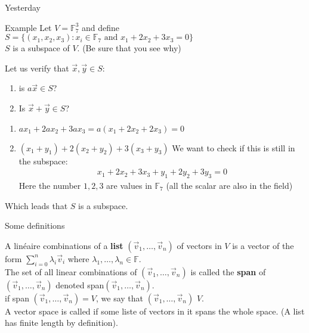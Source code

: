 


\begin{parag}{Yesterday}
    
    \begin{subparag}{Example}
        Let $V =  \mathbb{F}_7^3$ and define $S =  \{\left(x_1, x_2, x_3\right): x_i \in \mathbb{F}_7 \text{ and } x_1 + 2x_2 + 3x_3 = 0\}$\\
        $S$ is a subspace of $V$. (Be sure that you see why)
    \end{subparag}
    Let us verify that $\vec{x}, \vec{y} \in S$:\\
    \begin{enumerate}
        \item is $a\vec{x} \in S$?
        \item Is $\vec{x} + \vec{y} \in S$?
    \end{enumerate}
    \begin{enumerate}
        \item $ax_1 + 2ax_2 + 3ax_3 = a\left(x_1 + 2x_2 + 2x_3\right) =  0$
        \item $\left(x_1 + y_1\right) + 2\left(x_2 + y_2\right) + 3\left(x_3 + y_3\right)$ We want to check if this is still in the subspace:
            \begin{align*} 
                x_1 + 2x_2 + 3x_3 + y_1 + 2y_2 + 3y_3 = 0
            \end{align*}
            Here the number $1, 2, 3$ are values in $\mathbb{F}_7$ (all the scalar are also in the field)
    \end{enumerate}
    Which leads that $S$ is a subspace.
\end{parag}
\begin{parag}{Some definitions }
    \begin{definition}
    A linéaire combinations of a \textbf{list} $\left(\vec{v}_1, \ldots, \vec{v}_n\right)$ of vectors in $V$ is a vector of the form $\sum_{i = 0}^{n} \lambda_i \vec{v}_i$ where $\lambda_1, \ldots, \lambda_n \in \mathbb{F}$.\\
    The set of all linear combinations of $\left(\vec{v}_1, \ldots, \vec{v}_n\right)$ is called the \textbf{span} of $\left(\vec{v}_1, \ldots, \vec{v}_n\right)$ denoted span$\left(\vec{v}_1, \ldots, \vec{v}_n\right)$.\\
if span $\left(\vec{v}_1, \ldots, \vec{v}_n\right) =  V$, we say that $\left(\vec{v}_1, \ldots, \vec{v}_n\right)$  $V$.\\
A vector space is called  if some liste of vectors in it spans the whole space. (A list has finite length by definition).
    \end{definition}
\end{parag}

